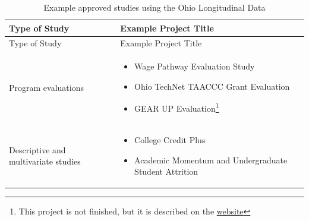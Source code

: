 \documentclass[
]{WileySix}
\providecommand{\tightlist}{%
  \setlength{\itemsep}{0pt}\setlength{\parskip}{0pt}}
\begin{document}
\begin{longtable}[]{@{}ll@{}}
\caption{\label{tab:oldatable2} Example approved studies using the Ohio Longitudinal Data}\tabularnewline
\toprule
\begin{minipage}[b]{0.28\columnwidth}\raggedright
Type of Study\strut
\end{minipage} & \begin{minipage}[b]{0.66\columnwidth}\raggedright
Example Project Title\strut
\end{minipage}\tabularnewline
\midrule
\endfirsthead
\toprule
\begin{minipage}[b]{0.28\columnwidth}\raggedright
Type of Study\strut
\end{minipage} & \begin{minipage}[b]{0.66\columnwidth}\raggedright
Example Project Title\strut
\end{minipage}\tabularnewline
\midrule
\endhead
\begin{minipage}[t]{0.28\columnwidth}\raggedright
Program evaluations\strut
\end{minipage} & \begin{minipage}[t]{0.66\columnwidth}\raggedright
\begin{itemize}
\tightlist
\item
  Wage Pathway Evaluation
  Study \citep{hawley2019}
\item
  Ohio TechNet TAACCC
  Grant Evaluation
  \citep{newgrowthgrouptheohioeducationresearchcenter2018}
\item
  GEAR UP
  Evaluation\footnote{This project is not finished, but it is described on the \href{https://www.ohiohighered.org/gearup}{website}}
\end{itemize}\strut
\end{minipage}\tabularnewline
\begin{minipage}[t]{0.28\columnwidth}\raggedright
Descriptive and
multivariate studies\strut
\end{minipage} & \begin{minipage}[t]{0.66\columnwidth}\raggedright
\begin{itemize}
\tightlist
\item
  College Credit Plus
  \citep{harlow2018}
\item
  Academic Momentum and
  Undergraduate Student
  Attrition
  \citep{kondratjeva2017}
\end{itemize}\strut
\end{minipage}\tabularnewline
\bottomrule
\end{longtable}
\end{document}
